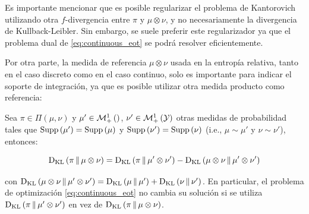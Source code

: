 Es importante mencionar que es posible regularizar el problema de Kantorovich utilizando otra $f$-divergencia entre $\pi$ y $\mu\otimes\nu$, y no necesariamente la divergencia de Kullback-Leibler. Sin embargo, se suele preferir este regularizador ya que el problema dual de \eqref{eq:continuous_eot} se podrá resolver eficientemente.

Por otra parte, la medida de referencia $\mu\otimes\nu$ usada en la entropía relativa, tanto en el caso discreto como en el caso continuo, solo es importante para indicar el soporte de integración, ya que es posible utilizar otra medida producto como referencia:

\begin{prop}
	Sea $\pi\in\Pi(\mu,\nu)$ y $\mu'\in\mathcal{M}_+^1\left(\right)$, $\nu'\in\mathcal{M}_+^1\left(\mathcal{Y}\right)$ otras medidas de probabilidad tales que $\operatorname{Supp}\left(\mu'\right) = \operatorname{Supp}\left(\mu\right)$ y $\operatorname{Supp}\left(\nu'\right) = \operatorname{Supp}\left(\nu\right)$ (i.e., $\mu\sim\mu'$ y $\nu\sim\nu'$), entonces:

	\begin{equation*}
		\operatorname{D_{KL}}\left(\pi\,\|\,\mu\otimes\nu\right) = \operatorname{D_{KL}}\left(\pi\,\|\,\mu'\otimes\nu'\right) - \operatorname{D_{KL}}\left(\mu\otimes\nu\,\|\,\mu'\otimes\nu'\right)
	\end{equation*}

	con $\operatorname{D_{KL}}\left(\mu\otimes\nu\,\|\,\mu'\otimes\nu'\right) = \operatorname{D_{KL}}\left(\mu\,\|\,\mu'\right) + \operatorname{D_{KL}}\left(\nu\,\|\,\nu'\right)$. En particular, el problema de optimización \eqref{eq:continuous_eot} no cambia su solución si se utiliza $\operatorname{D_{KL}}\left(\pi\,\|\,\mu'\otimes\nu'\right)$ en vez de $\operatorname{D_{KL}}\left(\pi\,\|\,\mu\otimes\nu\right)$.
\end{prop}

